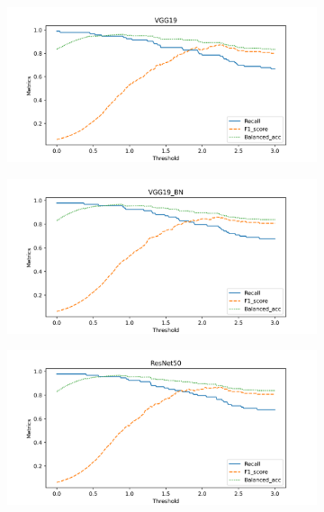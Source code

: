 \begin{figure}[H]
    \centering
    \begin{subfigure}{0.48\textwidth}
        \centering
        \includegraphics[width=\textwidth]{./results/comparison/VGG19_threshold.png}
    \end{subfigure}
    \begin{subfigure}{0.48\textwidth}
        \centering
        \includegraphics[width=\textwidth]{./results/comparison/VGG19_BN_threshold.png}
    \end{subfigure}
    \begin{subfigure}{0.48\textwidth}
        \centering
        \includegraphics[width=\textwidth]{./results/comparison/ResNet50_threshold.png}

\end{subfigure}
\end{figure}
